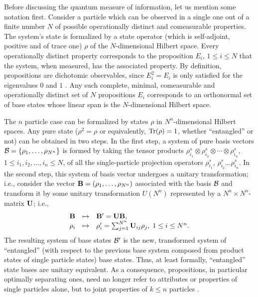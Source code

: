 Before discussing the quantum measure of information, let us mention some notation first.
Consider a particle which can be observed in a single one out of
a finite number
$N$ of possible operationally distinct and comeasurable properties.
The system's state is
formalized by a state operator (which is self-adjoint, positive and of
trace one)
$\rho$ of the $N$-dimensional Hilbert space. Every  operationally
distinct
property corresponds to the proposition $E_i$, $1\le i\le N$ that the
system, when measured, has the associated property.
By definition, propositions are dichotomic observables, since
$E_i^2=E_i$ is only satisfied for the eigenvalues $0$ and $1$
\cite{v-neumann-49}.
Any such complete, minimal, comeasurable and operationally distinct set
of $N$ propositions $E_i$ corresponds to an orthonormal set of base
states whose linear span is the $N$-dimensional Hilbert space.

The $n$ particle case can be formalized
by states $\rho$ in $N^n$-dimensional Hilbert spaces.
Any pure state
($\rho^2=\rho$ or equivalently, ${\rm Tr} (\rho )=1$, whether ``entangled'' or not)
can be obtained in two steps.
In the first step,
a system of pure basis vectors ${\cal B} = \{\rho_1,\ldots ,\rho_{N^n}\}$
is formed by taking the tensor products
$\rho^s_{i_1}\otimes \rho^s_{i_2}\otimes \cdots \otimes\rho^s_{i_n}$,
$1\le i_1,i_2,\ldots ,i_n \le N$,
of all the single-particle
projection operators
$\rho^s_{i_1}$, $\rho^s_{i_2}\ldots \rho^s_{i_n}$.
In the second step, this system of basis vector undergoes a unitary transformation;
i.e., consider the vector ${\bf B}=(\rho_1,\ldots ,\rho_{N^n})$
associated with the basis ${\cal B}$ and transform it by some
unitary
transformation $U(N^n)$ represented by a $N^n \times N^n$-matrix ${\bf U}$; i.e.,
\begin{equation}
\begin{array}{llll}
{\bf B} &\mapsto &{\bf B}' =   {\bf U} {\bf B} ,\\
\rho_i &\mapsto &\rho_i' = \sum_{j=1}^{N^n}{\bf U}_{ij}\rho_j, \; 1\le i\le N^n.
\end{array}
\label{2001-general-e0}
\end{equation}
The resulting system of base states ${\cal B}'$ is the new, transformed system of
``entangled'' (with respect to the previous base system composed from product states of single particle states)
base states.
Thus, at least formally, ``entangled'' state bases are
unitary equivalent.
As a consequence,  propositions, in particular optimally separating
ones, need no longer refer to attributes
or properties of single particles alone, but to joint properties of $k\le n$
particles
\cite{zeil-99,DonSvo01}.

